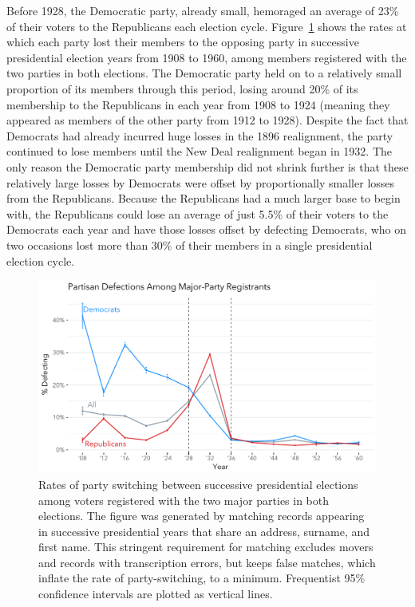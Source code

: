 \documentclass[11pt]{scrartcl}\usepackage[]{graphicx}\usepackage[]{color}
\makeatletter
\def\maxwidth{ %
  \ifdim\Gin@nat@width>\linewidth
    \linewidth
  \else
    \Gin@nat@width
  \fi
}
\newenvironment{knitrout}{}{} %
\makeatother
\begin{document}
Before 1928, the Democratic party, already small, hemoraged an average of 23\% of their voters to the Republicans each election cycle. Figure~\ref{fig:pid_switching} shows the rates at which each party lost their members to the opposing party in successive presidential election years from 1908 to 1960, among members registered with the two parties in both elections. The Democratic party held on to a relatively small proportion of its members through this period, losing around  20\% of its membership to the Republicans in each year from 1908 to 1924 (meaning they appeared as members of the other party from 1912 to 1928). Despite the fact that Democrats had already incurred huge losses in the 1896 realignment, the party continued to lose members until the New Deal realignment began in 1932.  The only reason the Democratic party membership did not shrink further is that these relatively large losses by Democrats were offset by proportionally smaller losses from the Republicans. Because the Republicans had a much larger base to begin with, the Republicans could lose an average of just 5.5\% of their voters to the Democrats each year and have those losses offset by defecting Democrats, who on two occasions lost more than 30\% of their members in a single presidential election cycle.


\begin{knitrout}
\color{fgcolor}\begin{figure}

{\centering \includegraphics[width=\maxwidth]{figures/plots-pid_switching-1} 

}

\caption[Rates of party switching between successive presidential elections among voters registered with the two major parties in both elections]{Rates of party switching between successive presidential elections among voters registered with the two major parties in both elections. The figure was generated by matching records appearing in successive presidential years that share an address, surname, and first name. This stringent requirement for matching excludes movers and records with transcription errors, but keeps false matches, which inflate the rate of party-switching, to a minimum. Frequentist 95\% confidence intervals are plotted as vertical lines.}\label{fig:pid_switching}
\end{figure}


\end{knitrout}
 
\end{document}
